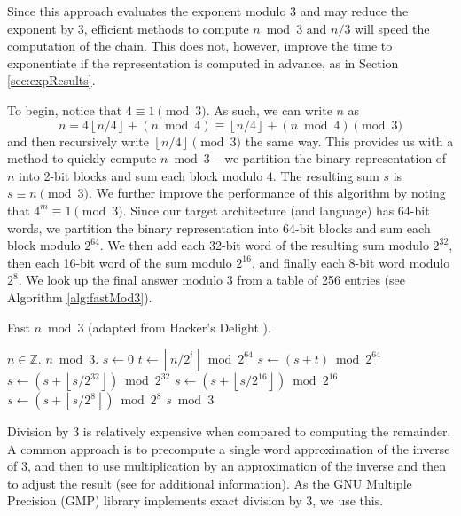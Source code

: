 \documentclass{ucalgthes1}
\theoremstyle{definition}
\newcommand{\ZZ}{\mathbb{Z}}
\newcommand{\floor}[1]{\left\lfloor #1 \right\rfloor}
\begin{document}
Since this approach evaluates the exponent modulo 3 and may reduce the exponent by 3, efficient methods to compute $n \bmod 3$ and $n/3$ will speed the computation of the chain.  This does not, however, improve the time to exponentiate if the representation is computed in advance, as in Section \ref{sec:expResults}.

To begin, notice that $4 \equiv 1 \pmod 3$.  As such, we can write $n$ as
\[
n = 4 \floor{n/4} + (n \bmod 4) \equiv \floor{n/4} + (n \bmod 4) \pmod 3
\]
and then recursively write $\floor{n/4} \pmod 3$ the same way. This provides us with a method to quickly compute $n \bmod 3$ -- we partition the binary representation of $n$ into \mbox{2-bit} blocks and sum each block modulo 4.  The resulting sum $s$ is $s \equiv n \pmod 3$.  We further improve the performance of this algorithm by noting that $4^m \equiv 1 \pmod 3$.  Since our target architecture (and language) has 64-bit words, we partition the binary representation into 64-bit blocks and sum each block modulo $2^{64}$.  We then add each 32-bit word of the resulting sum modulo $2^{32}$, then each 16-bit word of the sum modulo $2^{16}$, and finally each 8-bit word modulo $2^8$.  We look up the final answer modulo 3 from a table of 256 entries (see Algorithm \ref{alg:fastMod3}).

\begin{algorithm}[htb]
\caption{Fast $n \bmod 3$ (adapted from Hacker's Delight \cite{Warren2002}).}
\label{alg:fastMod3}
\begin{algorithmic}[1]
\Require $n \in \ZZ$.
\Ensure $n \bmod 3$.
\State $s \gets 0$
\For {$i$ from $0$ to $\floor{\log_2 n}$ by 64}
	\State $t \gets \floor{n / 2^i} \bmod {2^{64}}$
	\State $s \gets (s + t) \bmod {2^{64}}$
\EndFor
\State $s \gets \left(s + \floor{s/{2^{32}}} \right) \bmod {2^{32}}$
\State $s \gets \left(s + \floor{s/{2^{16}}} \right) \bmod {2^{16}}$
\State $s \gets \left(s + \floor{s/{2^{8}}} \right) \bmod {2^{8}}$
\State \Return $s \bmod 3$ 
\end{algorithmic}
\end{algorithm}

Division by 3 is relatively expensive when compared to computing the remainder.  A common approach is to precompute a single word approximation of the inverse of 3, and then to use multiplication by an approximation of the inverse and then to adjust the result (see \cite{Granlund1994,Warren2002,Moller2011} for additional information).  As the GNU Multiple Precision (GMP) library implements exact division by 3, we use this.
\end{document}
